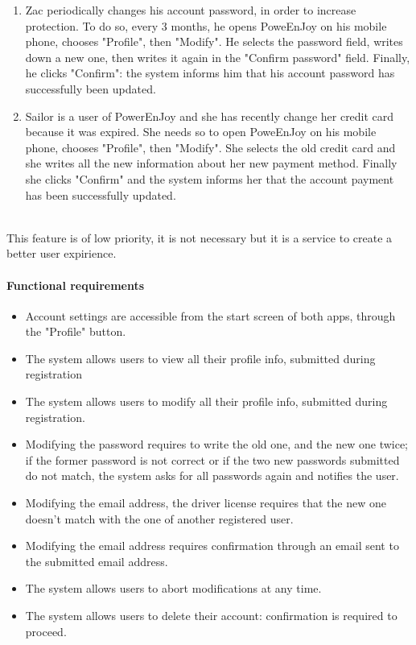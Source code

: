 \begin{enumerate}
	\item  Zac periodically changes his account password, in order to increase protection. To do so, every 3 months, he opens PoweEnJoy on his mobile phone, chooses "Profile", then "Modify". He selects the password field, writes down a new one, then writes it again in the "Confirm password" field. Finally, he clicks "Confirm": the system informs him that his account password has successfully been updated.
	\item Sailor is a user of PowerEnJoy and she has recently change her credit card because it was expired. She needs so to open PoweEnJoy on his mobile phone, chooses "Profile", then "Modify". She selects the old credit card and she writes all the new information about her new payment method. Finally she clicks "Confirm" and the system informs her that the account payment has been successfully updated.
\end{enumerate}
 \ \\
This feature is of low priority, it is not necessary but it is a service to create a better user expirience.
\paragraph{Functional requirements }
\begin{itemize}
	\item Account settings are accessible from the start screen of both apps, through the "Profile" button.
	\item The system allows users to view all their profile info, submitted during registration
	\item The system allows users to modify all their profile info, submitted during registration.
	\item Modifying the password requires to write the old one, and the new one twice; if the former password is not correct or if the two new passwords submitted do not match, the system asks for all passwords again and notifies the user.
	\item Modifying the email address, the driver license requires that the new one doesn't match with the one of another registered user.
	\item Modifying the email address requires confirmation through an email sent to the submitted email address.
	\item The system allows users to abort modifications at any time.
	\item The system allows users to delete their account: confirmation is required to proceed.
\end{itemize}
\newpage

